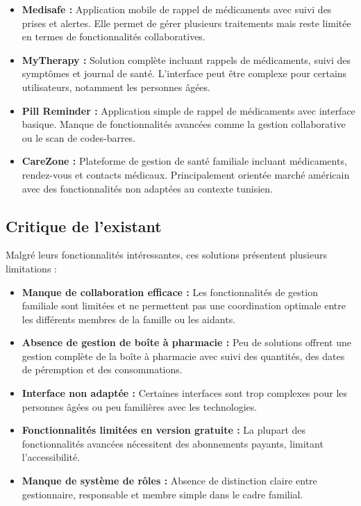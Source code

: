 \begin{itemize}
    \item \textbf{Medisafe :} Application mobile de rappel de médicaments avec suivi des prises et alertes. Elle permet de gérer plusieurs traitements mais reste limitée en termes de fonctionnalités collaboratives.

    \item \textbf{MyTherapy :} Solution complète incluant rappels de médicaments, suivi des symptômes et journal de santé. L'interface peut être complexe pour certains utilisateurs, notamment les personnes âgées.

    \item \textbf{Pill Reminder :} Application simple de rappel de médicaments avec interface basique. Manque de fonctionnalités avancées comme la gestion collaborative ou le scan de codes-barres.

    \item \textbf{CareZone :} Plateforme de gestion de santé familiale incluant médicaments, rendez-vous et contacts médicaux. Principalement orientée marché américain avec des fonctionnalités non adaptées au contexte tunisien.
\end{itemize}

\subsection{Critique de l'existant}
Malgré leurs fonctionnalités intéressantes, ces solutions présentent plusieurs limitations :

\begin{itemize}
    \item \textbf{Manque de collaboration efficace :} Les fonctionnalités de gestion familiale sont limitées et ne permettent pas une coordination optimale entre les différents membres de la famille ou les aidants.

    \item \textbf{Absence de gestion de boîte à pharmacie :} Peu de solutions offrent une gestion complète de la boîte à pharmacie avec suivi des quantités, des dates de péremption et des consommations.

    \item \textbf{Interface non adaptée :} Certaines interfaces sont trop complexes pour les personnes âgées ou peu familières avec les technologies.

    \item \textbf{Fonctionnalités limitées en version gratuite :} La plupart des fonctionnalités avancées nécessitent des abonnements payants, limitant l'accessibilité.

    \item \textbf{Manque de système de rôles :} Absence de distinction claire entre gestionnaire, responsable et membre simple dans le cadre familial.
\end{itemize}

